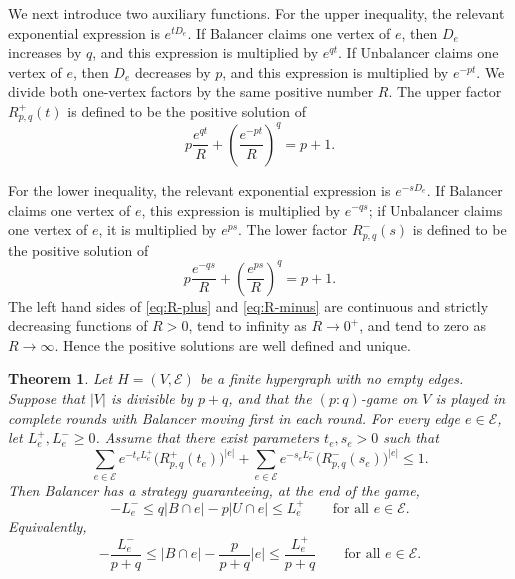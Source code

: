 \documentclass[twoside,12pt]{article}
\numberwithin{equation}{section}
\newtheorem{theorem}{Theorem}[section]
\begin{document}
We next introduce two auxiliary functions. For the upper inequality, the relevant exponential expression is $e^{tD_e}$. If Balancer claims one vertex of $e$, then $D_e$ increases by $q$, and this expression is multiplied by $e^{qt}$. If Unbalancer claims one vertex of $e$, then $D_e$ decreases by $p$, and this expression is multiplied by $e^{-pt}$. We divide both one-vertex factors by the same positive number $R$. The upper factor $R^+_{p,q}(t)$ is defined to be the positive solution of
\begin{equation}
\label{eq:R-plus}
        p\frac{e^{qt}}{R}
        +
        \left(\frac{e^{-pt}}{R}\right)^q
        =
        p+1 .
\end{equation}

For the lower inequality, the relevant exponential expression is $e^{-sD_e}$. If Balancer claims one vertex of $e$, this expression is multiplied by $e^{-qs}$; if Unbalancer claims one vertex of $e$, it is multiplied by $e^{ps}$. The lower factor $R^-_{p,q}(s)$ is defined to be the positive solution of
\begin{equation}
\label{eq:R-minus}
        p\frac{e^{-qs}}{R}
        +
        \left(\frac{e^{ps}}{R}\right)^q
        =
        p+1.
\end{equation}
The left hand sides of \eqref{eq:R-plus} and \eqref{eq:R-minus} are continuous and strictly decreasing functions of $R>0$, tend to infinity as $R\to0^+$, and tend to zero as $R\to\infty$. Hence the positive solutions are well defined and unique.


\begin{theorem}
\label{thm:main}
Let $H=(V,\mathcal E)$ be a finite hypergraph with no empty edges. Suppose that $|V|$ is divisible by $p+q$, and that the $(p:q)$-game on $V$ is played in complete rounds with Balancer moving first in each round. For every edge $e\in\mathcal E$, let $L_e^+,L_e^-\ge0$. Assume that there exist parameters $t_e,s_e>0$ such that
\begin{equation}
\label{eq:main-condition}
        \sum_{e\in\mathcal E} e^{-t_eL_e^+}
        \bigl(R^+_{p,q}(t_e)\bigr)^{|e|}
        +
        \sum_{e\in\mathcal E} e^{-s_eL_e^-}
        \bigl(R^-_{p,q}(s_e)\bigr)^{|e|}
        \le 1.
\end{equation}
Then Balancer has a strategy guaranteeing, at the end of the game,
\[
        -L_e^-\le q|B\cap e|-p|U\cap e|\le L_e^+
        \qquad\text{for all }e\in\mathcal E.
\]
Equivalently,
\[
        -\frac{L_e^-}{p+q}\le
        |B\cap e|-\frac{p}{p+q}|e|\le
        \frac{L_e^+}{p+q}
        \qquad\text{for all }e\in\mathcal E.
\]
\end{theorem}
\end{document}
